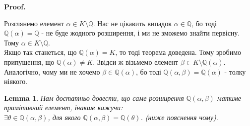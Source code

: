 \documentclass[a4paper, 14pt]{extarticle}
\makeatletter
\theoremstyle{theoremdd}
\theoremstyle{theoremdd}
\theoremstyle{theoremdd}
\theoremstyle{theoremdd}
\theoremstyle{theoremdd}
\theoremstyle{theoremdd}
\theoremstyle{theoremdd}
\newtheorem{lemma}[theorem]{Lemma}
\theoremstyle{theoremdd}
\def\qed{$\blacksquare$}
\renewenvironment{proof}[1][Proof.\\]{\par
\pushQED{\hfill \qed}%
\normalfont \topsep6\p@\@plus6\p@\relax
\trivlist
\item\relax
{\bfseries
#1\@addpunct{.}}\hspace\labelsep\ignorespaces
}{%
\popQED\endtrivlist\@endpefalse
}
\makeatother
\begin{document}
\begin{proof}
Розглянемо елемент $\alpha \in K \setminus \mathbb{Q}$. Нас не цікавить випадок $\alpha \in \mathbb{Q}$, бо тоді $\mathbb{Q}(\alpha) = \mathbb{Q}$ - не буде жодного розширення, і ми не зможемо знайти первісну. Тому $\alpha \in K \setminus \mathbb{Q}$.\\
Якщо так станеться, що $\mathbb{Q}(\alpha) = K$, то тоді теорема доведена. Тому зробимо припущення, що $\mathbb{Q}(\alpha) \neq K$. Звідси ж візьмемо елемент $\beta \in K \setminus \mathbb{Q}(\alpha)$. Аналогічно, чому ми не хочемо $\beta \in \mathbb{Q}(\alpha)$, бо тоді $\mathbb{Q}(\alpha,\beta) = \mathbb{Q}(\alpha)$ - толку ніякого.

\begin{lemma}
Нам достатньо довести, що саме розширення $\mathbb{Q}(\alpha,\beta)$ матиме примітивний елемент, інакше кажучи:\\
$\exists \theta \in \mathbb{Q}(\alpha,\beta)$, для якого $\mathbb{Q}(\alpha,\beta) = \mathbb{Q}(\theta)$. (ниже пояснення чому).
\end{lemma}


\end{proof}
\end{document}
